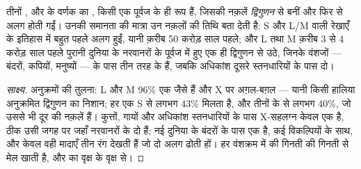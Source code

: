 \begin{proposition}[द्विगुणनों से बना जीनों का एक कुल]\label{prop:g11:the-eye:family}
तीनों  , और  के वर्णक का , किसी एक पूर्वज  के ही रूप
हैं, जिसकी नक़लें \emph{द्विगुणन} से बनीं और फिर  से अलग होती
गईं। उनकी समानता की मात्रा उन नक़लों की तिथि बता देती है: S और L/M वाली
रेखाएँ  के इतिहास में बहुत पहले अलग हुईं, यानी क़रीब 50 करोड़
साल पहले; और L तथा M  क़रीब 3 से 4 करोड़ साल पहले पुरानी दुनिया के
नरवानरों के पूर्वज में हुए एक ही द्विगुणन से उठे, जिनके वंशजों --- बंदरों,
कपियों, मनुष्यों --- के पास तीन तरह के  हैं, जबकि अधिकांश दूसरे
स्तनधारियों के पास दो।
\end{proposition}
\begin{proof}[साक्ष्य]
अनुक्रमों की तुलना: L और M  96\% एक जैसे हैं और X पर अग़ल-बग़ल --- यानी
किसी हालिया अनुक्रमित द्विगुणन का निशान; हर एक S  से लगभग 43\% मिलता है,
और तीनों  के   से लगभग 40\%, जो उससे भी दूर की नक़लें हैं।
कुत्तों, गायों और अधिकांश स्तनधारियों के पास X-सहलग्न केवल एक  
है, ठीक उसी जगह पर जहाँ नरवानरों के दो हैं; नई दुनिया के बंदरों के पास एक
है, कई विकल्पियों के साथ, और केवल वही मादाएँ तीन रंग देखती हैं जो दो अलग
 ढोती हों। हर वंशक्रम में  की गिनती  की गिनती से मेल खाती
है, और  का वृक्ष  के वृक्ष से।
\end{proof}

